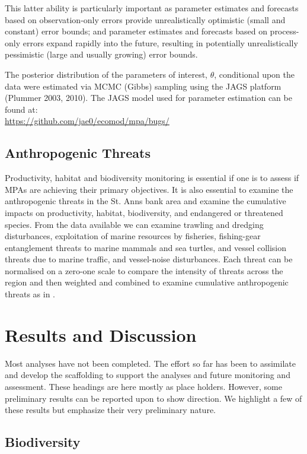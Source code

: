 \documentclass[letterpaper,portrait,11pt]{scrartcl}
\numberwithin{equation}{section}		%
\numberwithin{figure}{section}		%
\numberwithin{table}{section}				%
\begin{document}
This latter ability is particularly important as parameter estimates and forecasts based on observation-only errors provide unrealistically optimistic (small and constant) error bounds; and parameter estimates and forecasts based on process-only errors expand rapidly into the future, resulting in potentially unrealistically pessimistic (large and usually growing) error bounds.

The posterior distribution of the parameters of interest, $\theta$, conditional upon the data were estimated via MCMC (Gibbs) sampling using the JAGS platform (Plummer 2003, 2010). The JAGS model used for parameter estimation can be found at: \\

\url{https://github.com/jae0/ecomod/mpa/bugs/}

\subsection{Anthropogenic Threats}
Productivity, habitat and biodiversity monitoring is essential if one is to assess if MPAs are achieving their primary objectives. It is also essential to examine the anthropogenic threats in the St. Anns bank area and examine the cumulative impacts on productivity, habitat, biodiversity, and endangered or threatened species. From the data available we can examine trawling and dredging disturbances, exploitation of marine resources by fisheries, fishing-gear entanglement threats to marine mammals and sea turtles, and vessel collision threats due to marine traffic, and vessel-noise disturbances. Each threat can be normalised on a zero-one scale to compare the intensity of threats across the region and then weighted and combined to examine cumulative anthropogenic threats as in \textcite{coll:2012:mediterranean}.

\section{Results and Discussion}

Most analyses have not been completed. The effort so far has been to assimilate and develop the scaffolding to support the analyses and future monitoring and assessment. These headings are here mostly as place holders. However, some preliminary results can be reported upon to show direction. We highlight a few of these results but emphasize their very preliminary nature. 

\subsection{Biodiversity}
\end{document}
